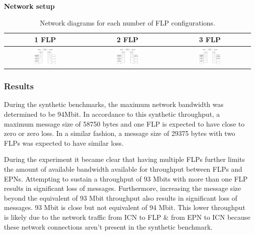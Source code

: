 \documentclass[]{article}
\begin{document}
\begin{table}[H]
	\textbf{Network setup}
	\begin{center}
		\begin{tabular}{ | c | c | c | }
			\hline
			\textbf{1 FLP} & \textbf{2 FLP} & \textbf{3 FLP} \\ \hline
			
			\includegraphics[width=0.3\textwidth]{images/network-baseline-1} & \includegraphics[width=0.3\textwidth]{images/network-baseline-2} & \includegraphics[width=0.3\textwidth]{images/network-baseline-3} \\ \hline
		\end{tabular}
		\caption{Network diagrams for each number of FLP configurations.}
		\label{tab:networksetupbaseline}
	\end{center}
\end{table}

\subsubsection{Results}
During the synthetic benchmarks, the maximum network bandwidth was determined to be 94Mbit. In accordance to this synthetic throughput, a maximum message size of 58750 bytes and one FLP is expected to have close to zero or zero loss. In a similar fashion, a message size of 29375 bytes with two FLPs was expected to have similar loss. 

During the experiment it became clear that having multiple FLPs further limits the amount of available bandwidth available for throughput between FLPs and EPNs. Attempting to sustain a throughput of 93 Mbits with more than one FLP results in significant loss of messages. Furthermore, increasing the message size beyond the equivalent of 93 Mbit throughput also results in significant loss of messages. 93 Mbit is close but not equivalent of 94 Mbit. This lower throughput is likely due to the network traffic from ICN to FLP \& from EPN to ICN because these network connections aren’t present in the synthetic benchmark.
\end{document}
